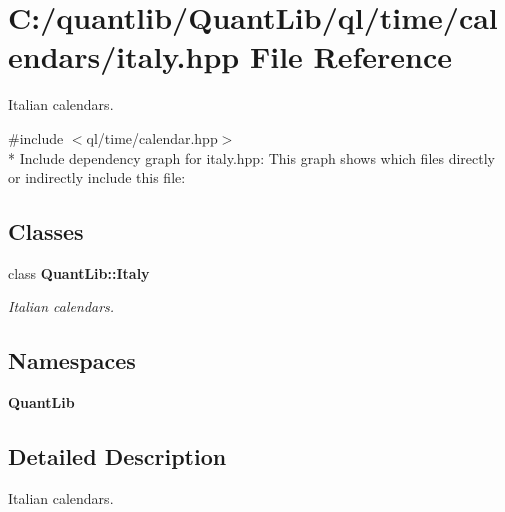 \section{C\+:/quantlib/\+Quant\+Lib/ql/time/calendars/italy.hpp File Reference}
\label{italy_8hpp}


Italian calendars.  


{\ttfamily \#include $<$ql/time/calendar.\+hpp$>$}\\*
Include dependency graph for italy.\+hpp\+:
This graph shows which files directly or indirectly include this file\+:
\subsection*{Classes}
\begin{DoxyCompactItemize}
\item 
class {\bf Quant\+Lib\+::\+Italy}
\begin{DoxyCompactList}\small\item\em Italian calendars. \end{DoxyCompactList}\end{DoxyCompactItemize}
\subsection*{Namespaces}
\begin{DoxyCompactItemize}
\item 
 {\bf Quant\+Lib}
\end{DoxyCompactItemize}


\subsection{Detailed Description}
Italian calendars. 

